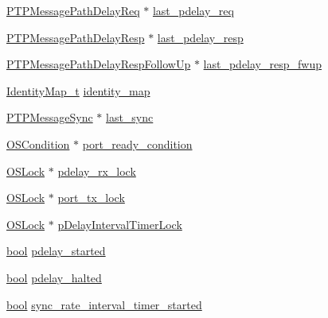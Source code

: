 \begin{DoxyCompactItemize}
\hyperlink{class_p_t_p_message_path_delay_req}{P\+T\+P\+Message\+Path\+Delay\+Req} $\ast$ \hyperlink{class_ether_port_a4300731ae1f9227ce6fc7beb3ec7154e}{last\+\_\+pdelay\+\_\+req}
\item 
\hyperlink{class_p_t_p_message_path_delay_resp}{P\+T\+P\+Message\+Path\+Delay\+Resp} $\ast$ \hyperlink{class_ether_port_ae42ae1d14ca1ea4fd052840dc72b3a81}{last\+\_\+pdelay\+\_\+resp}
\item 
\hyperlink{class_p_t_p_message_path_delay_resp_follow_up}{P\+T\+P\+Message\+Path\+Delay\+Resp\+Follow\+Up} $\ast$ \hyperlink{class_ether_port_a52f6326649e826493014ebcdc8c6172d}{last\+\_\+pdelay\+\_\+resp\+\_\+fwup}
\item 
\hyperlink{ether__port_8hpp_a6864851c1ec54dd1562c2a576746d6cd}{Identity\+Map\+\_\+t} \hyperlink{class_ether_port_af7d8b88bd14d1af7c3f5f8efd29de43f}{identity\+\_\+map}
\item 
\hyperlink{class_p_t_p_message_sync}{P\+T\+P\+Message\+Sync} $\ast$ \hyperlink{class_ether_port_af6040215fd575e4a1461161cae10ad40}{last\+\_\+sync}
\item 
\hyperlink{class_o_s_condition}{O\+S\+Condition} $\ast$ \hyperlink{class_ether_port_af34f0a0361d75a05cfe798511931cf1b}{port\+\_\+ready\+\_\+condition}
\item 
\hyperlink{class_o_s_lock}{O\+S\+Lock} $\ast$ \hyperlink{class_ether_port_aac3e8dea9249220719fdb1b4568af804}{pdelay\+\_\+rx\+\_\+lock}
\item 
\hyperlink{class_o_s_lock}{O\+S\+Lock} $\ast$ \hyperlink{class_ether_port_aac3f11c7b8748ed8a3d6d1b099d15a7a}{port\+\_\+tx\+\_\+lock}
\item 
\hyperlink{class_o_s_lock}{O\+S\+Lock} $\ast$ \hyperlink{class_ether_port_aa3a07b2cba419592d5cea3e6b944ff32}{p\+Delay\+Interval\+Timer\+Lock}
\item 
\hyperlink{avb__gptp_8h_af6a258d8f3ee5206d682d799316314b1}{bool} \hyperlink{class_ether_port_af9e28e779ea4250af88009ccf7b783e6}{pdelay\+\_\+started}
\item 
\hyperlink{avb__gptp_8h_af6a258d8f3ee5206d682d799316314b1}{bool} \hyperlink{class_ether_port_a4f1a8de50cc802d20341857ad81b24ff}{pdelay\+\_\+halted}
\item 
\hyperlink{avb__gptp_8h_af6a258d8f3ee5206d682d799316314b1}{bool} \hyperlink{class_ether_port_a6379434fb3c5bf494ec370d4ca1c448f}{sync\+\_\+rate\+\_\+interval\+\_\+timer\+\_\+started}
\end{DoxyCompactItemize}
